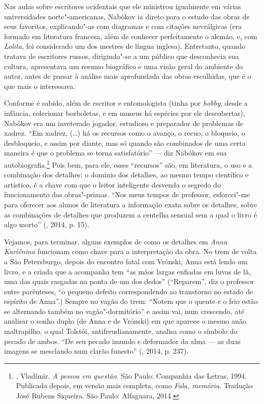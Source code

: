 Nas aulas sobre escritores ocidentais que ele ministrou igualmente em
várias universidades norte"-americanas, Nabókov ia direto para o estudo das
obras de seus favoritos, explicando"-as com diagramas e com citações
nevrálgicas (era formado em literatura francesa, além de conhecer
perfeitamente o alemão, e, com \emph{Lolita}, foi considerado um dos
mestres de língua inglesa). Entretanto, quando tratava de escritores
russos, dirigindo"-se a um público que desconhecia sua
cultura, apresentava um resumo biográfico e uma visão geral do ambiente
do autor, antes de passar à análise mais aprofundada das
obras escolhidas, que é o que mais o interessava.

Conforme é sabido, além de escritor e entomologista (tinha por
\emph{hobby}, desde a infância, colecionar borboletas, e em museus
há espécies por ele descobertas), Nabókov era um inveterado
jogador, estudioso e preparador de problemas de xadrez. ``Em xadrez,
(\ldots{}) há os recursos como o avanço, o recuo, o bloqueio, o desbloqueio, e
assim por diante, mas só quando são combinados de uma certa maneira é
que o problema se torna satisfatório'' --- diz Nabókov em sua
autobiografia.\footnote{, Vladímir. \emph{A pessoa em questão}. São Paulo: Companhia das Letras, 1994.
Publicada depois, em versão mais completa, como \emph{Fala, memória}. Tradução José Rubens Siqueira. São Paulo: Alfaguara, 2014.} Pois bem,
para ele, esses ``recursos'' são, em literatura, o uso e a combinação
dos detalhes: o domínio dos detalhes, ao mesmo tempo científico e
artístico, é a chave com que o leitor inteligente desvenda o segredo
do funcionamento das obras"-primas. ``Nos meus tempos de professor,
esforcei"-me para oferecer aos alunos de literatura a informação exata
sobre os detalhes, sobre as combinações de detalhes que produzem a
centelha sensual sem a qual o livro é algo morto'' (, 2014, p. 15).

Vejamos, para terminar, alguns exemplos de como os detalhes em
\emph{Anna Kariénina} funcionam como chave para a
interpretação da obra. No trem de volta a São Petersburgo, depois do
encontro fatal com Vrónski, Anna está lendo um livro, e a criada que a
acompanha tem ``as mãos largas enfiadas em luvas de lã, uma das quais
rasgadas na ponta de um dos dedos'' (``Reparem'', diz o
professor entre parênteses, ``o pequeno defeito
correspondendo ao transtorno no estado de espírito de Anna''.)
Sempre no vagão do trem: ``Notem que o quente e o frio estão se
alternando também no vagão"-dormitório'' e assim vai, num crescendo, até
analisar o sonho duplo (de Anna e de Vrónski) em que aparece o mesmo
anão maltrapilho, o qual Tolstói, antifreudianamente, analisa como o
símbolo do pecado de ambos. ``De seu pecado imundo e deformador da alma
--- as duas imagens se mesclando num clarão funesto'' (, 2014, p. 237).

